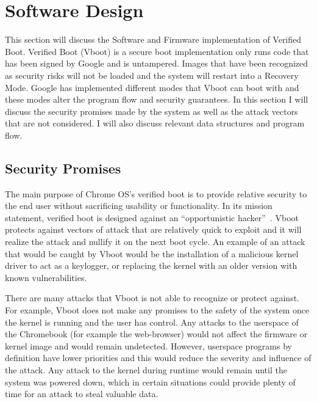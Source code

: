 \documentclass[../report.tex]{subfiles}
\begin{document}
\onehalfspacing

\newpage
\section{Software Design}


This section will discuss the Software and Firmware implementation of Verified
Boot. 
Verified Boot (Vboot) is a secure boot implementation only runs code that has
been signed by Google and is untampered.
Images that have been recognized as security risks will not be loaded and the system will restart into a Recovery Mode.
Google has implemented different modes that Vboot can boot with and these modes alter the program flow and security guarantees.
In this section I will discuss the security promises made by the system as well
as the attack vectors that are not considered.
I will also discuss relevant data structures and program flow.

\subsection{Security Promises}

The main purpose of Chrome OS's verified boot is to provide relative security to the end user without sacrificing usability or functionality. 
In its mission statement, verified boot is designed against an ``opportunistic hacker''~\cite{vboot-design-doc}.
Vboot protects against vectors of attack that are relatively quick to exploit and it will realize the attack and nullify it on the next boot cycle.
An example of an attack that would be caught by Vboot would be the installation of a malicious kernel driver to act as a keylogger, or replacing the kernel with an older version with known vulnerabilities.

There are many attacks that Vboot is not able to recognize or protect against.
For example, Vboot does not make any promises to the safety of the system once the kernel is running and the user has control. 
Any attacks to the userspace of the Chromebook (for example the web-browser) would not affect the firmware or kernel image and would remain undetected.
However, userspace programs by definition have lower priorities and this would reduce the severity and influence of the attack.
Any attack to the kernel during runtime would remain until the system was powered down, which in certain situations could provide plenty of time for an attack to steal valuable data.
\end{document}
